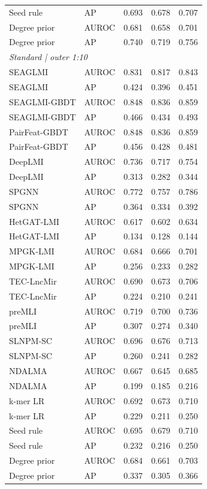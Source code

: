 {\begin{longtable}{lllll}
Seed rule & AP & 0.693 & 0.678 & 0.707 \\
Degree prior & AUROC & 0.681 & 0.658 & 0.701 \\
Degree prior & AP & 0.740 & 0.719 & 0.756 \\
\multicolumn{5}{l}{\textit{Standard | outer 1:10}}\\
SEAGLMI & AUROC & 0.831 & 0.817 & 0.843 \\
SEAGLMI & AP & 0.424 & 0.396 & 0.451 \\
SEAGLMI-GBDT & AUROC & 0.848 & 0.836 & 0.859 \\
SEAGLMI-GBDT & AP & 0.466 & 0.434 & 0.493 \\
PairFeat-GBDT & AUROC & 0.848 & 0.836 & 0.859 \\
PairFeat-GBDT & AP & 0.456 & 0.428 & 0.481 \\
DeepLMI & AUROC & 0.736 & 0.717 & 0.754 \\
DeepLMI & AP & 0.313 & 0.282 & 0.344 \\
SPGNN & AUROC & 0.772 & 0.757 & 0.786 \\
SPGNN & AP & 0.364 & 0.334 & 0.392 \\
HetGAT-LMI & AUROC & 0.617 & 0.602 & 0.634 \\
HetGAT-LMI & AP & 0.134 & 0.128 & 0.144 \\
MPGK-LMI & AUROC & 0.684 & 0.666 & 0.701 \\
MPGK-LMI & AP & 0.256 & 0.233 & 0.282 \\
TEC-LncMir & AUROC & 0.690 & 0.673 & 0.706 \\
TEC-LncMir & AP & 0.224 & 0.210 & 0.241 \\
preMLI & AUROC & 0.719 & 0.700 & 0.736 \\
preMLI & AP & 0.307 & 0.274 & 0.340 \\
SLNPM-SC & AUROC & 0.696 & 0.676 & 0.713 \\
SLNPM-SC & AP & 0.260 & 0.241 & 0.282 \\
NDALMA & AUROC & 0.667 & 0.645 & 0.685 \\
NDALMA & AP & 0.199 & 0.185 & 0.216 \\
k-mer LR & AUROC & 0.692 & 0.673 & 0.710 \\
k-mer LR & AP & 0.229 & 0.211 & 0.250 \\
Seed rule & AUROC & 0.695 & 0.679 & 0.710 \\
Seed rule & AP & 0.232 & 0.216 & 0.250 \\
Degree prior & AUROC & 0.684 & 0.661 & 0.703 \\
Degree prior & AP & 0.337 & 0.305 & 0.366 \\
\end{longtable}
}
